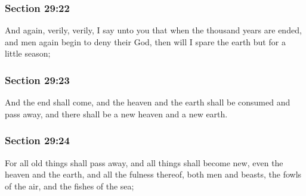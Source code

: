 	\subsubsection{Section 29:22} %
		\label{DC29-22}

		And again, verily, verily, I say unto you that when the thousand years are ended, and men again begin to deny their God, then will I spare the earth but for a little season;


	\subsubsection{Section 29:23} %
		\label{DC29-23}

		And the end shall come, and the heaven and the earth shall be consumed and pass away, and there shall be a new heaven and a new earth.


	\subsubsection{Section 29:24} %
		\label{DC29-24}

		For all old things shall pass away, and all things shall become new, even the heaven and the earth, and all the fulness thereof, both men and beasts, the fowls of the air, and the fishes of the sea;

